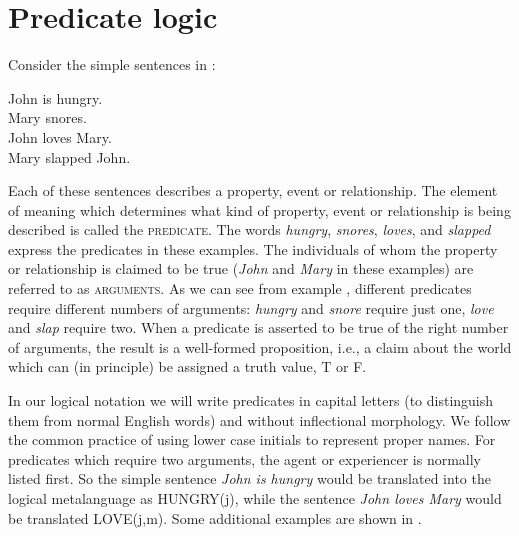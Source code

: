 \section{Predicate logic}\label{sec:4.4}

Consider the simple sentences in :


\ea \label{ex:4.22}
\ea John is hungry.\\
\ex Mary snores.\\
\ex John loves Mary.\\
\ex Mary slapped John.
                       \z
\z


Each of these sentences describes a property, event or relationship. The element of meaning which determines what kind of property, event or relationship is being described is called the \textsc{predicate}. The words \textit{hungry}, \textit{snores}, \textit{loves}, and \textit{slapped} express the predicates in these examples. The individuals of whom the property or relationship is claimed to be true (\textit{John} and \textit{Mary} in these examples) are referred to as \textsc{arguments}. As we can see from example , different predicates require different numbers of arguments: \textit{hungry} and \textit{snore} require just one, \textit{love} and \textit{slap} require two. When a predicate is asserted to be true of the right number of arguments, the result is a well-formed proposition, i.e., a claim about the world which can (in principle) be assigned a truth value, T or F.



In our logical notation we will write predicates in capital letters (to distinguish them from normal English words) and without inflectional morphology. We follow the common practice of using lower case initials to represent proper names. For predicates which require two arguments, the agent or experiencer is normally listed first. So the simple sentence \textit{John is hungry} would be translated into the logical metalanguage as HUNGRY(j), while the sentence \textit{John loves Mary} would be translated LOVE(j,m). Some additional examples are shown in .




